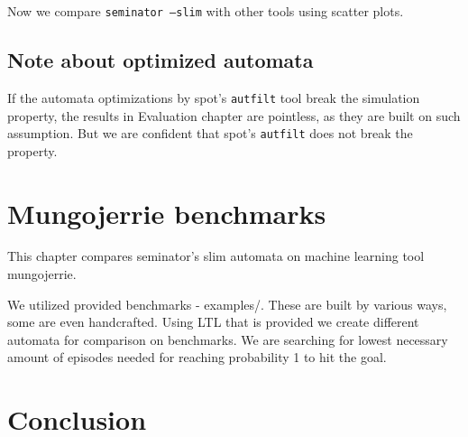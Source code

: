 \documentclass[
	digital
nolof, nolot
]{fithesis3}
\begin{document}
		
		
		
		
		Now we compare \texttt{seminator --slim} with other tools using scatter plots.
		
		
		\begin{tikzpicture}
			
		\end{tikzpicture}
	
		\begin{tikzpicture}
		
		\end{tikzpicture}
	
	\begin{tikzpicture}
		
	\end{tikzpicture}
		\section{Note about optimized automata}
		If the automata optimizations by spot's 
		\texttt{autfilt} tool break the simulation property, the results in Evaluation chapter are pointless, as they are built on such assumption. But we are confident that spot's \texttt{autfilt} does not break the property.
	\chapter{Mungojerrie benchmarks}
	This chapter compares seminator's slim automata on machine learning tool mungojerrie.
	
	We utilized provided benchmarks - examples/. These are built by various ways, some are even handcrafted. Using LTL that is provided we create different automata for comparison on benchmarks. We are searching for lowest necessary amount of episodes needed for reaching probability 1 to hit the goal. 
	
	
	
	

	
	
	\chapter{Conclusion}
\end{document}
